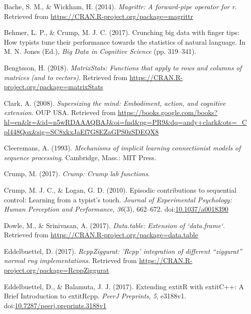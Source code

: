 \documentclass[floatsintext,man]{apa6}
\theoremstyle{definition}
\theoremstyle{definition}
\theoremstyle{definition}
\theoremstyle{remark}
\begin{document}
\hypertarget{ref-R-magrittr}{}
Bache, S. M., \& Wickham, H. (2014). \emph{Magrittr: A forward-pipe
operator for r}. Retrieved from
\url{https://CRAN.R-project.org/package=magrittr}

\hypertarget{ref-behmer_crunching_2017}{}
Behmer, L. P., \& Crump, M. J. C. (2017). Crunching big data with finger
tips: How typists tune their performance towards the statistics of
natural language. In M. N. Jones (Ed.), \emph{Big Data in Cognitive
Science} (pp. 319--341).

\hypertarget{ref-R-matrixStats}{}
Bengtsson, H. (2018). \emph{MatrixStats: Functions that apply to rows
and columns of matrices (and to vectors)}. Retrieved from
\url{https://CRAN.R-project.org/package=matrixStats}

\hypertarget{ref-clark_supersizing_2008}{}
Clark, A. (2008). \emph{Supersizing the mind: Embodiment, action, and
cognitive extension}. OUP USA. Retrieved from
\url{https://books.google.com/books?hl=en\&lr=\&id=n5wRDAAAQBAJ\&oi=fnd\&pg=PR9\&dq=andy+clark\&ots=_Cpl448Qox\&sig=SC8xkxJaEf7G8EZaGPS0zSDEQX8}

\hypertarget{ref-cleeremans_mechanisms_1993}{}
Cleeremans, A. (1993). \emph{Mechanisms of implicit learning
connectionist models of sequence processing}. Cambridge, Mass.: MIT
Press.

\hypertarget{ref-R-Crump}{}
Crump, M. (2017). \emph{Crump: Crump lab functions}.

\hypertarget{ref-crump_episodic_2010}{}
Crump, M. J. C., \& Logan, G. D. (2010). Episodic contributions to
sequential control: Learning from a typist's touch. \emph{Journal of
Experimental Psychology: Human Perception and Performance},
\emph{36}(3), 662--672.
doi:\href{https://doi.org/10.1037/a0018390}{10.1037/a0018390}

\hypertarget{ref-R-data.table}{}
Dowle, M., \& Srinivasan, A. (2017). \emph{Data.table: Extension of
`data.frame`}. Retrieved from
\url{https://CRAN.R-project.org/package=data.table}

\hypertarget{ref-R-RcppZiggurat}{}
Eddelbuettel, D. (2017). \emph{RcppZiggurat: 'Rcpp' integration of
different ``ziggurat'' normal rng implementations}. Retrieved from
\url{https://CRAN.R-project.org/package=RcppZiggurat}

\hypertarget{ref-R-Rcpp_b}{}
Eddelbuettel, D., \& Balamuta, J. J. (2017). Extending extitR with
extitC++: A Brief Introduction to extitRcpp. \emph{PeerJ Preprints},
\emph{5}, e3188v1.
doi:\href{https://doi.org/10.7287/peerj.preprints.3188v1}{10.7287/peerj.preprints.3188v1}
\end{document}
